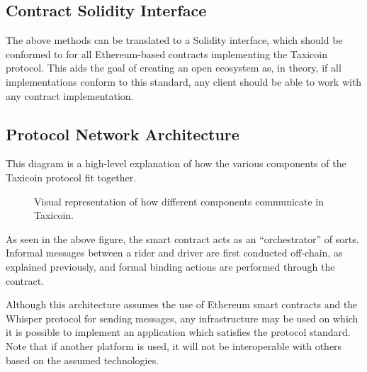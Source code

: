 

\subsection{Contract Solidity Interface}

The above methods can be translated to a Solidity interface, which should be conformed to for all Ethereum-based contracts implementing the Taxicoin protocol. This aids the goal of creating an open ecosystem as, in theory, if all implementations conform to this standard, any client should be able to work with any contract implementation.



\subsection{Protocol Network Architecture}

This diagram is a high-level explanation of how the various components of the Taxicoin protocol fit together.

\begin{figure}[h!]
\centering
{}
\caption{Visual representation of how different components communicate in Taxicoin.}
\end{figure}

As seen in the above figure, the smart contract acts as an \enquote{orchestrator} of sorts. Informal messages between a rider and driver are first conducted off-chain, as explained previously, and formal binding actions are performed through the contract.

Although this architecture assumes the use of Ethereum smart contracts and the Whisper protocol for sending messages, any infrastructure may be used on which it is possible to implement an application which satisfies the protocol standard. Note that if another platform is used, it will not be interoperable with others based on the assumed technologies.

